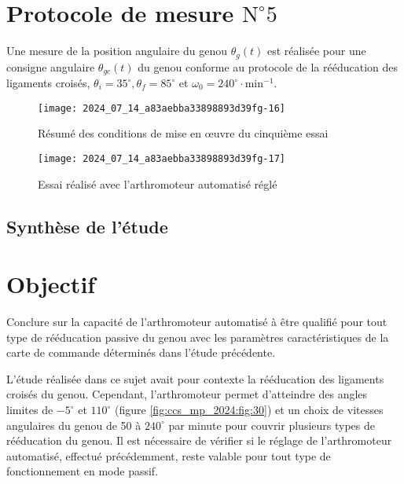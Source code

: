 \section*{Protocole de mesure $\mathrm{N}^{\circ} 5$}
Une mesure de la position angulaire du genou $\theta_{g}(t)$ est réalisée pour une consigne angulaire $\theta_{g c}(t)$ du genou conforme au protocole de la rééducation des ligaments croisés, $\theta_{i}=35^{\circ}, \theta_{f}=85^{\circ}$ et $\omega_{0}=240^{\circ} \cdot \mathrm{min}^{-1}$.

\begin{figure}[!h]\centering
\texttt{[image: 2024\_07\_14\_a83aebba33898893d39fg-16]}
\caption{\label{fig:ccs_mp_2024:fig:28}Résumé des conditions de mise en œuvre du cinquième essai}
\end{figure}


\begin{figure}[!h]\centering
\texttt{[image: 2024\_07\_14\_a83aebba33898893d39fg-17]}
\caption{\label{fig:ccs_mp_2024:fig:29}Essai réalisé avec l'arthromoteur automatisé réglé}
\end{figure}
\subsection{Synthèse de l'étude}

\section*{Objectif}
Conclure sur la capacité de l'arthromoteur automatisé à être qualifié pour tout type de rééducation passive du genou avec les paramètres caractéristiques de la carte de commande déterminés dans l'étude précédente.

L'étude réalisée dans ce sujet avait pour contexte la rééducation des ligaments croisés du genou. Cependant, l'arthromoteur permet d'atteindre des angles limites de $-5^{\circ}$ et $110^{\circ}$ (figure \ref{fig:ccs_mp_2024:fig:30}) et un choix de vitesses angulaires du genou de 50 à $240^{\circ}$ par minute pour couvrir plusieurs types de rééducation du genou. Il est nécessaire de vérifier si le réglage de l'arthromoteur automatisé, effectué précédemment, reste valable pour tout type de fonctionnement en mode passif.

